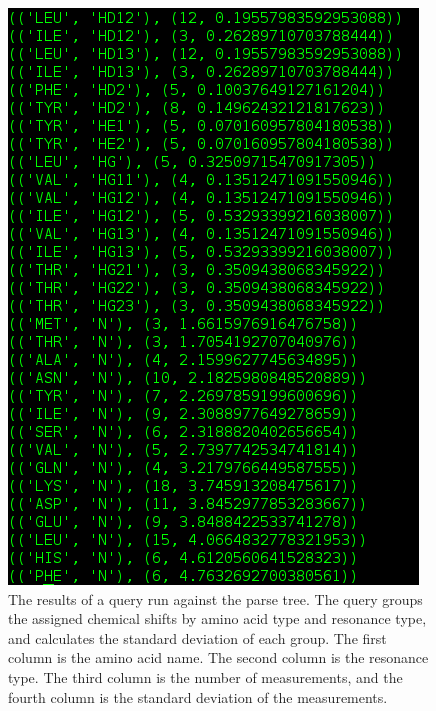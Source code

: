 \begin{figure}
  \includegraphics[scale=0.5]{figures/nmrpystar_query}
  \caption[The results of a query run against the parse tree.]
          {The results of a query run against the parse tree.
           The query groups the assigned chemical shifts by
           amino acid type and resonance type, and calculates the 
           standard deviation of each group.  The first column
           is the amino acid name.  The second column is the resonance type.
           The third column is the number of measurements, and
           the fourth column is the standard deviation of the
           measurements.}
  \label{nmrpystar_query}
\end{figure}

